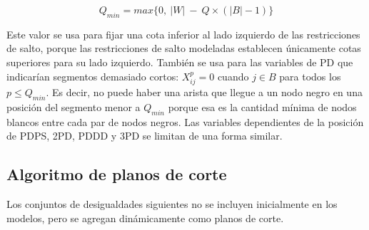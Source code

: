\documentclass[10pt, a4paper]{article}
\theoremstyle{definition}
\begin{document}
$$
Q_{min} = max\{0,\ |W|\ -\ Q \times (|B| - 1)\}
$$

Este valor se usa para fijar una cota inferior al lado izquierdo de las restricciones de salto, porque las restricciones de salto modeladas establecen únicamente cotas superiores para su lado izquierdo. También se usa para las variables de PD que indicarían segmentos demasiado cortos: $X_{ij}^{p} = 0$ cuando $j \in B$ para todos los $p \leq Q_{min}$. Es decir, no puede haber una arista que llegue a un nodo negro en una posición del segmento menor a $Q_{min}$ porque esa es la cantidad mínima de nodos blancos entre cada par de nodos negros. Las variables dependientes de la posición de PDPS, 2PD, PDDD y 3PD se limitan de una forma similar.

\subsection{Algoritmo de planos de corte}

Los conjuntos de desigualdades siguientes no se incluyen inicialmente en los modelos, pero se agregan dinámicamente como planos de corte.
\end{document}
